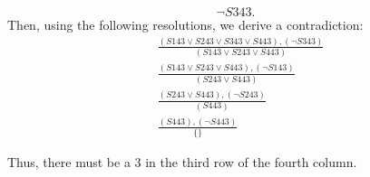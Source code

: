 \documentclass{article}
\begin{document}
\begin{enumerate}
\begin{enumerate}
\begin{equation*}
			\neg S343.
			\end{equation*}
			Then, using the following resolutions, we derive a contradiction:
			\begin{align*}
			&\frac{(S143 \lor S243 \lor S343 \lor S443),(\neg S343)}{(S143 \lor S243 \lor S443)} \\
			&\frac{(S143 \lor S243 \lor S443),(\neg S143)}{(S243 \lor S443)} \\
			&\frac{(S243 \lor S443),(\neg S243)}{(S443)} \\
			&\frac{(S443),(\neg S443)}{\{\}}
			\end{align*}
		\end{enumerate}
	Thus, there must be a 3 in the third row of the fourth column.
	\end{enumerate}
	
\end{document}

